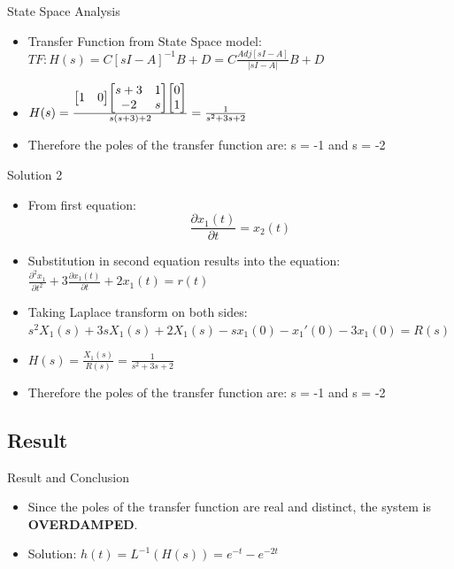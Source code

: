 \documentclass{beamer}
\begin{document}
\begin{frame}{State Space Analysis}
    \begin{itemize}
        \item Transfer Function from State Space model: $TF: H(s) = C[sI-A]^{-1}B + D = C\frac{Adj[sI-A]}{|sI-A|}B + D$
        \item $H(s) = \frac{\begin{bmatrix}
        1 & 0
        \end{bmatrix}\begin{bmatrix}
        s+3 & 1\\
        -2 & s
        \end{bmatrix}\begin{bmatrix}
        0\\
        1
        \end{bmatrix}}{s(s+3) + 2} = \LARGE{\frac{1}{s^{2}+3s+2}}$
        \item Therefore the poles of the transfer function are: s = -1 and s = -2
    \end{itemize}
\end{frame}



\begin{frame}{Solution 2}
\begin{block}


\begin{itemize}
\item From first equation: $$\frac{\partial x_1(t)}{\partial t} =              x_2(t) $$
\item Substitution in second equation results into the equation:\vspace{5} $\frac{\partial^2 x_1}{\partial t^2} + 3\frac{\partial x_1(t)}{\partial t} + 2x_1(t) = r(t)$ 
\item Taking Laplace transform on both sides:\vspace{5}
$s^2X_1(s) + 3sX_1(s) + 2X_1(s) - sx_1(0) - x_1'(0) -3x_1(0)  = R(s)$
\item $ H(s) = \frac{X_1(s)}{R(s)} = \frac{1}{s^2 + 3s + 2}$
\item Therefore the poles of the transfer function are: s = -1 and s = -2
\end{itemize}
\end{block}

\end{frame}

\subsection{Result}

\begin{frame}{Result and Conclusion}

\begin{itemize}
    \item Since the poles of the transfer function are real and distinct, the system is \textbf{OVERDAMPED}.
    \item Solution: $h(t) = L^{-1}(H(s)) = e^{-t} - e^{-2t}$
\end{itemize}

\end{frame}
\end{document}
